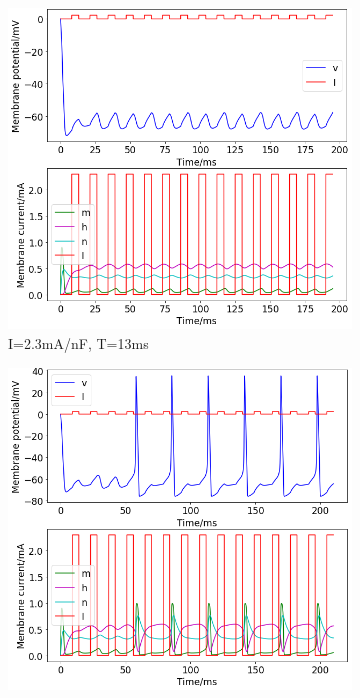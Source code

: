 \documentclass[twoside,twocolumn]{article}
\begin{document}
\begin{figure}[h]
  \centering
  \begin{subfigure}[t]{0.49\textwidth}
    \includegraphics[width=\linewidth]{23-13}
  \caption{I=2.3mA/nF, T=13ms}
  \label{sub:2b23-13}
  \end{subfigure}
  \begin{subfigure}[t]{0.49\textwidth}
    \includegraphics[width=\linewidth]{23-14}

\end{subfigure}
\end{figure}
\end{document}
